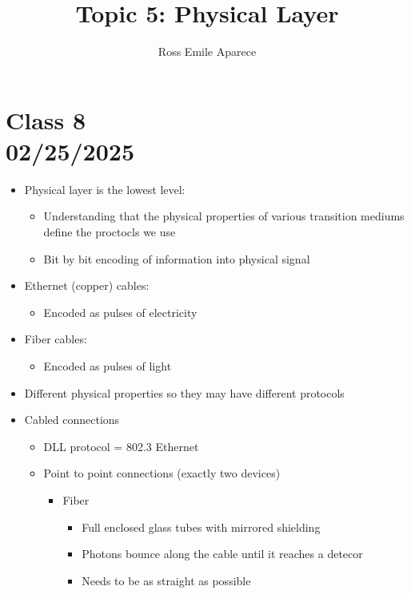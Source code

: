 \documentclass{article}
\title{Topic 5: Physical Layer}
\date{}
\author{Ross Emile Aparece}
\begin{document}
\maketitle

\section*{Class 8 \\ 02/25/2025}\label{sec:Class 8}
\begin{itemize}
    \item Physical layer is the lowest level:
    \begin{itemize}
        \item Understanding that the physical properties of various transition mediums define the proctocls we use
        \item Bit by bit encoding of information into physical signal
    \end{itemize}
    \item Ethernet (copper) cables: 
    \begin{itemize}
        \item Encoded as pulses of electricity 
    \end{itemize}
    \item Fiber cables:
    \begin{itemize}
        \item Encoded as pulses of light
    \end{itemize}
    \item Different physical properties so they may have different protocols
    \item Cabled connections
    \begin{itemize}
        \item DLL protocol = 802.3 Ethernet
        \item Point to point connections (exactly two devices)
        \begin{itemize}
            \item Fiber
            \begin{itemize}
                \item Full enclosed glass tubes with mirrored shielding
                \item Photons bounce along the cable until it reaches a detecor 
                \item Needs to be as straight as possible
            \end{itemize}
        \end{itemize}

\end{itemize}
\end{itemize}
\end{document}
